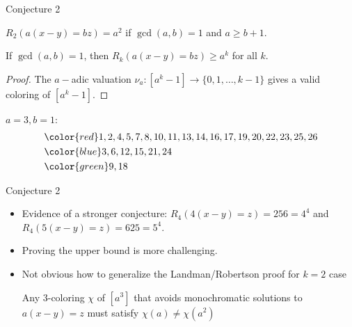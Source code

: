 \documentclass{beamer}
\begin{document}
\begin{frame}{Conjecture 2}
\begin{theorem}
	$R_2(a(x-y) = bz) = a^2$ if $\gcd(a,b) = 1$ and $a\ge b+1$. 
\end{theorem}

\pause
\begin{theorem}[CW]
	If $\gcd(a,b) = 1$, then $R_k(a(x-y) = bz) \ge a^k$ for all $k$. 
\end{theorem}
\pause
\begin{proof}
	The $a-$adic valuation $\nu_a: [a^k-1] \to \{0,1,\dots,k-1\}$ gives a valid coloring of $[a^k-1]$. 
\end{proof}
\begin{example}
	$a = 3, b = 1$:
	\begin{align*}
	&{\color{red} 1,2,4,5,7,8,10,11,13,14,16,17,19,20,22,23,25,26} \\
&	{\color{blue} 3,6,12,15,21,24} \\
	&{\color{green} 9,18} \\ 
	\end{align*}
\end{example}
\end{frame}

\begin{frame}{Conjecture 2}
\begin{itemize}
\item Evidence of a stronger conjecture: $R_4(4(x-y) = z) = 256 = 4^4$ and $R_4(5(x-y) = z) = 625 = 5^4$. 
\item \pause Proving the upper bound is more challenging. 
\item \pause Not obvious how to generalize the Landman/Robertson proof for $k = 2$ case

\pause \begin{lemma}[CW] 
Any 3-coloring $\chi$ of $[a^3]$ that avoids monochromatic solutions to $a(x-y) = z$ must satisfy $\chi(a) \neq \chi(a^2)$ 
\end{lemma}

\end{itemize}
\end{frame}
\end{document}
